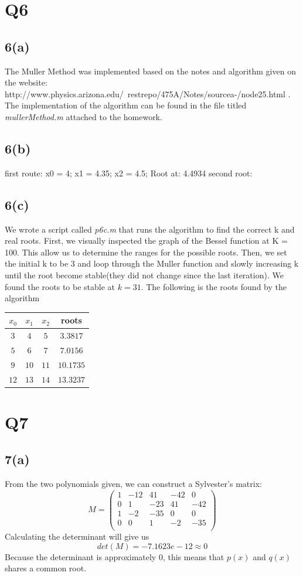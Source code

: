 \documentclass{article}
\begin{document}
\section{Q6}
\subsection{6(a)}
The Muller Method was implemented based on the notes and algorithm given on the website: http://www.physics.arizona.edu/~restrepo/475A/Notes/sourcea-/node25.html . The implementation of the algorithm can be found in the file titled \textit{mullerMethod.m} attached to the homework.
\subsection{6(b)}
first route:
x0 = 4;
x1 = 4.35;
x2 = 4.5;
Root at: 4.4934
second root:
\subsection{6(c)}
We wrote a script called \textit{p6c.m} that runs the algorithm to find the correct k and real roots. First, we visually inspected the graph of the Bessel function at K = 100. This allow us to determine the ranges for the possible roots. Then, we set the initial k to be 3 and loop through the Muller function and slowly increasing k until the root become stable(they did not change since the last iteration). We found the roots to be stable at $k = 31$. The following is the roots found by the algorithm\\
\begin{tabular}{|c|c|c|c|}
\hline
$x_0$ & $x_1$ & $x_2$ & roots \\ \hline
$3$ & $4$ & $5$ & $3.3817$ \\ \hline
$5$ & $6$ & $7$ & $7.0156$ \\ \hline
$9$ & $10$ & $11$ & $10.1735$ \\ \hline
$12$ & $13$ & $14$ & $13.3237$ \\ \hline

\end{tabular}

\section{Q7}
\subsection*{7(a)}
From the two polynomials given, we can construct a Sylvester's matrix:
\begin{equation*}
M = 
\begin{pmatrix}
1 &-12 &41 &-42& 0\\
0 &1   &-23 & 41 & -42\\
1& -2& -35& 0& 0\\
0& 0& 1& -2& -35\\ 
\end{pmatrix}
\end{equation*}
Calculating the determinant will give us
\begin{equation*}
det(M) = -7.1623e-12 \approx 0
\end{equation*}
Because the determinant is approximately 0, this means that $p(x)$ and $q(x)$ shares a common root.
\end{document}
